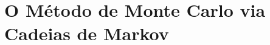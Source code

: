 \documentclass[12pt,reqno,a4paper,oneside]{report}
\begin{document}

\section*{\Large O Método de Monte Carlo via Cadeias de Markov}



%
\end{document}
